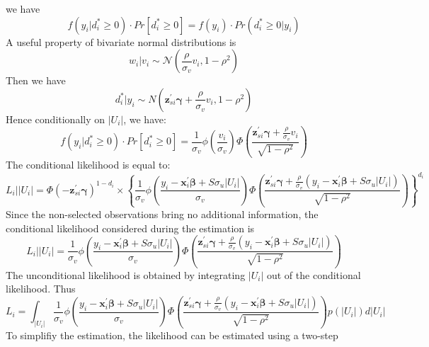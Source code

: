 \documentclass[nojss]{jss}
\begin{document}
 we have
 $$f(y_{i}|d_{i}^* \geq 0) \cdot Pr\left[ d_{i}^* \geq 0\right] = 
 f(y_{i}) \cdot Pr(d_{i}^* \geq 0|y_{i})$$
 A useful property of bivariate normal distributions \citep{tong} is 
 $$w_i|v_i \sim \mathcal{N}\left(\frac{\rho}{\sigma_v}v_i, 1 - \rho^2\right) $$
 Then we have
 $$d_{i}^* | y_{i} \sim N\left(\mathbf{z}_{si}^{\prime} \bm{\gamma}+
 \frac{\rho}{\sigma_v}v_i, 1-\rho^2\right)$$
 Hence conditionally on $|U_i|$, we have:
 \begin{equation}\label{eq:3.1.5}
 f(y_{i}|d_{i}^* \geq 0) \cdot Pr\left[ d_{i}^* \geq 0\right] = 
 \frac{1}{\sigma_v}\phi\left(\frac{v_i}{\sigma_v}\right)\Phi\left(\frac{
 \mathbf{z}_{si}^{\prime} \bm{\gamma}+\frac{\rho}{\sigma_v}v_i}{
 \sqrt{1-\rho^2}}\right)
 \end{equation}
 The conditional likelihood is equal to:
 \begin{equation}\label{eq:3.1.6}
 L_i\big||U_i| = \Phi(-\mathbf{z}_{si}^{\prime} \bm{\gamma})^{1-d_{i}} \times 
 \left\{ \frac{1}{\sigma_v}\phi\left(\frac{y_{i}-\mathbf{x}_{i}^{\prime}
 \bm{\beta} + S\sigma_u|U_i|}{\sigma_v}\right)\Phi\left(\frac{
 \mathbf{z}_{si}^{\prime} \bm{\gamma}+\frac{\rho}{\sigma_v}\left(y_{i}-
 \mathbf{x}_{i}^{\prime} \bm{\beta} + S\sigma_u|U_i|\right)}{\sqrt{1-\rho^2}}
 \right) \right\} ^{d_{i}}
 \end{equation}
 Since the non-selected observations bring no additional information, 
 the conditional likelihood considered during the estimation is
\begin{equation}\label{eq:3.1.7}
  L_i\big||U_i| = \frac{1}{\sigma_v}\phi\left(\frac{y_{i}-
 \mathbf{x}_{i}^{\prime} \bm{\beta} + S\sigma_u|U_i|}{\sigma_v}\right) 
 \Phi\left(\frac{\mathbf{z}_{si}^{\prime} \bm{\gamma}+\frac{\rho}{\sigma_v}
 \left(y_{i}-\mathbf{x}_{i}^{\prime} \bm{\beta} + S\sigma_u|U_i|\right)}{
 \sqrt{1-\rho^2}}\right) 
 \end{equation}
%
 The unconditional likelihood is obtained by integrating $|U_i|$ out of 
 the conditional likelihood. Thus
 \begin{equation}\label{eq:3.1.8}
 L_i = \int_{|U_i|} \frac{1}{\sigma_v}\phi\left(\frac{y_{i}-
 \mathbf{x}_{i}^{\prime} \bm{\beta} + S\sigma_u|U_i|}{\sigma_v}\right) 
 \Phi\left(\frac{\mathbf{z}_{si}^{\prime} \bm{\gamma}+ \frac{\rho}{\sigma_v}
 \left(y_{i}-\mathbf{x}_{i}^{\prime} \bm{\beta} + S\sigma_u|U_i|\right)}{
 \sqrt{1-\rho^2}}\right)p\left(|U_i|\right)d|U_i|
 \end{equation}
 To simplifiy the estimation, the likelihood can be estimated using a two-step 
\end{document}
